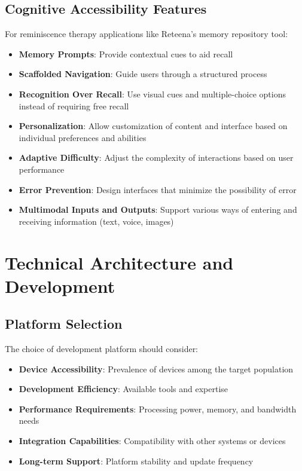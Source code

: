 \subsection{Cognitive Accessibility Features}
\begin{tcolorbox}[infobox, title=Specific Recommendations for Memory Repository Tools]
For reminiscence therapy applications like Reteena's memory repository tool:
\begin{itemize}
    \item \textbf{Memory Prompts}: Provide contextual cues to aid recall
    \item \textbf{Scaffolded Navigation}: Guide users through a structured process
    \item \textbf{Recognition Over Recall}: Use visual cues and multiple-choice options instead of requiring free recall
    \item \textbf{Personalization}: Allow customization of content and interface based on individual preferences and abilities
    \item \textbf{Adaptive Difficulty}: Adjust the complexity of interactions based on user performance
    \item \textbf{Error Prevention}: Design interfaces that minimize the possibility of error
    \item \textbf{Multimodal Inputs and Outputs}: Support various ways of entering and receiving information (text, voice, images)
\end{itemize}
\end{tcolorbox}

\section{Technical Architecture and Development}
\subsection{Platform Selection}
The choice of development platform should consider:
\begin{itemize}
    \item \textbf{Device Accessibility}: Prevalence of devices among the target population
    \item \textbf{Development Efficiency}: Available tools and expertise
    \item \textbf{Performance Requirements}: Processing power, memory, and bandwidth needs
    \item \textbf{Integration Capabilities}: Compatibility with other systems or devices
    \item \textbf{Long-term Support}: Platform stability and update frequency
\end{itemize}

